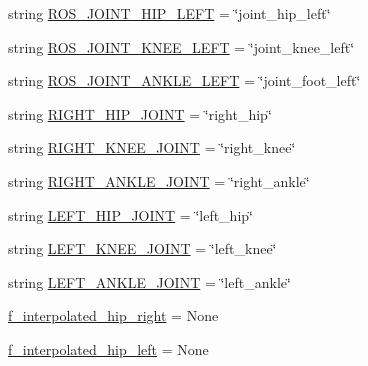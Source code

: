 \begin{DoxyCompactItemize}
\item 
string \mbox{\hyperlink{namespacepedal__simulation__interpolation__lennard_ad084f33fcefc58fe5c8f9026a8403b18}{R\+O\+S\+\_\+\+J\+O\+I\+N\+T\+\_\+\+H\+I\+P\+\_\+\+L\+E\+FT}} = \char`\"{}joint\+\_\+hip\+\_\+left\char`\"{}
\item 
string \mbox{\hyperlink{namespacepedal__simulation__interpolation__lennard_a0cfb07b033ea7726a798437727a4a978}{R\+O\+S\+\_\+\+J\+O\+I\+N\+T\+\_\+\+K\+N\+E\+E\+\_\+\+L\+E\+FT}} = \char`\"{}joint\+\_\+knee\+\_\+left\char`\"{}
\item 
string \mbox{\hyperlink{namespacepedal__simulation__interpolation__lennard_af90827b5f81bd104e111119d48d2f051}{R\+O\+S\+\_\+\+J\+O\+I\+N\+T\+\_\+\+A\+N\+K\+L\+E\+\_\+\+L\+E\+FT}} = \char`\"{}joint\+\_\+foot\+\_\+left\char`\"{}
\item 
string \mbox{\hyperlink{namespacepedal__simulation__interpolation__lennard_a48d0ba7804889a380785e411a367252e}{R\+I\+G\+H\+T\+\_\+\+H\+I\+P\+\_\+\+J\+O\+I\+NT}} = \char`\"{}right\+\_\+hip\char`\"{}
\item 
string \mbox{\hyperlink{namespacepedal__simulation__interpolation__lennard_a531338da60c4f9bd9c4d954908a77637}{R\+I\+G\+H\+T\+\_\+\+K\+N\+E\+E\+\_\+\+J\+O\+I\+NT}} = \char`\"{}right\+\_\+knee\char`\"{}
\item 
string \mbox{\hyperlink{namespacepedal__simulation__interpolation__lennard_a34370649f429614dc22e36e2ae8a4a99}{R\+I\+G\+H\+T\+\_\+\+A\+N\+K\+L\+E\+\_\+\+J\+O\+I\+NT}} = \char`\"{}right\+\_\+ankle\char`\"{}
\item 
string \mbox{\hyperlink{namespacepedal__simulation__interpolation__lennard_a5c32ddd1464d58341cf7411ffb5ae18a}{L\+E\+F\+T\+\_\+\+H\+I\+P\+\_\+\+J\+O\+I\+NT}} = \char`\"{}left\+\_\+hip\char`\"{}
\item 
string \mbox{\hyperlink{namespacepedal__simulation__interpolation__lennard_a42b7c80b5ded0f2bbdf8b48ed1b99804}{L\+E\+F\+T\+\_\+\+K\+N\+E\+E\+\_\+\+J\+O\+I\+NT}} = \char`\"{}left\+\_\+knee\char`\"{}
\item 
string \mbox{\hyperlink{namespacepedal__simulation__interpolation__lennard_a6434786403a40ce205b3136e5d7f72cf}{L\+E\+F\+T\+\_\+\+A\+N\+K\+L\+E\+\_\+\+J\+O\+I\+NT}} = \char`\"{}left\+\_\+ankle\char`\"{}
\item 
\mbox{\hyperlink{namespacepedal__simulation__interpolation__lennard_a514905b8806e6950e771d1441b14e916}{f\+\_\+interpolated\+\_\+hip\+\_\+right}} = None
\item 
\mbox{\hyperlink{namespacepedal__simulation__interpolation__lennard_abe2cc20a6730cb552249b6b8c93c9200}{f\+\_\+interpolated\+\_\+hip\+\_\+left}} = None

\end{DoxyCompactItemize}
